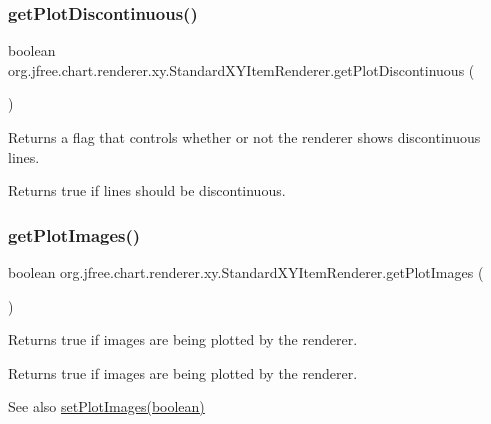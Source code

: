 \subsubsection{\texorpdfstring{get\+Plot\+Discontinuous()}{getPlotDiscontinuous()}}
{\footnotesize\ttfamily boolean org.\+jfree.\+chart.\+renderer.\+xy.\+Standard\+X\+Y\+Item\+Renderer.\+get\+Plot\+Discontinuous (\begin{DoxyParamCaption}{ }\end{DoxyParamCaption})}

Returns a flag that controls whether or not the renderer shows discontinuous lines.

\begin{DoxyReturn}{Returns}
{\ttfamily true} if lines should be discontinuous. 
\end{DoxyReturn}
\mbox{\label{classorg_1_1jfree_1_1chart_1_1renderer_1_1xy_1_1_standard_x_y_item_renderer_a79f82215d7545175b35c20e06344f055}} 
\subsubsection{\texorpdfstring{get\+Plot\+Images()}{getPlotImages()}}
{\footnotesize\ttfamily boolean org.\+jfree.\+chart.\+renderer.\+xy.\+Standard\+X\+Y\+Item\+Renderer.\+get\+Plot\+Images (\begin{DoxyParamCaption}{ }\end{DoxyParamCaption})}

Returns true if images are being plotted by the renderer.

\begin{DoxyReturn}{Returns}
{\ttfamily true} if images are being plotted by the renderer.
\end{DoxyReturn}
\begin{DoxySeeAlso}{See also}
\mbox{\hyperlink{classorg_1_1jfree_1_1chart_1_1renderer_1_1xy_1_1_standard_x_y_item_renderer_adfb9bbb5844a0cb4b60a51c5b8914a59}{set\+Plot\+Images(boolean)}} 
\end{DoxySeeAlso}
\mbox{\label{classorg_1_1jfree_1_1chart_1_1renderer_1_1xy_1_1_standard_x_y_item_renderer_ac8313f5d72c91cecb8b3f3d937624ad6}} 
